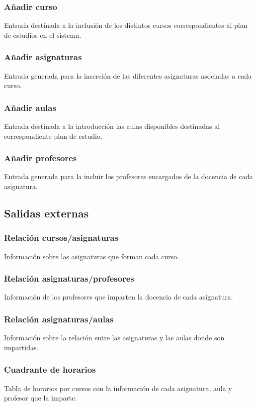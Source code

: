 \documentclass[11pt,a4paper,spanish,twoside]{book}
\begin{document}
\subsubsection{Añadir curso}
Entrada destinada a la inclusión de los distintos cursos correspondientes al
plan de estudios en el sistema.

\subsubsection{Añadir asignaturas}
Entrada generada para la inserción de las diferentes asignaturas asociadas a
cada curso.

\subsubsection{Añadir aulas}
Entrada destinada a la introducción las aulas disponibles destinadas al
correspondiente plan de estudio.

\subsubsection{Añadir profesores}
Entrada generada para la incluir los profesores encargados de la docencia de
cada asignatura.

\subsection{Salidas externas}
\subsubsection{Relación cursos/asignaturas}
Información sobre las asignaturas que forman cada curso.

\subsubsection{Relación asignaturas/profesores}
Información de los profesores que imparten la docencia de cada asignatura.

\subsubsection{Relación asignaturas/aulas}
Información sobre la relación entre las asignaturas y las aulas donde son
impartidas. 

\subsubsection{Cuadrante de horarios}
Tabla de horarios por cursos con la información de cada asignatura, aula y
profesor que la imparte.
\end{document}
